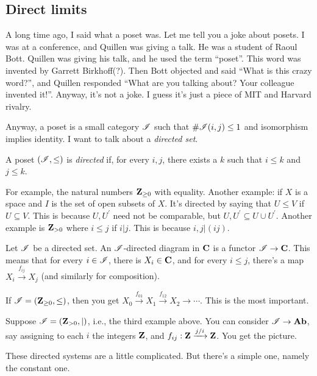 \subsection{Direct limits}
A long time ago, I said what a poset was. Let me tell you a joke about posets. I was at a conference, and Quillen was giving a talk. He was a student of Raoul Bott. Quillen was giving his talk, and he used the term ``poset''. This word was invented by Garrett Birkhoff(?). Then Bott objected and said ``What is this crazy word?'', and Quillen responded ``What are you talking about? Your colleague invented it!''. Anyway, it's not a joke. I guess it's just a piece of MIT and Harvard rivalry.

Anyway, a poset is a small category $\mathscr I$ such that $\#\mathscr I(i,j)\leq 1$ and isomorphism implies identity. I want to talk about a \emph{directed set}.
\begin{definition}
A poset $(\mathscr I,\leq)$ is \emph{directed} if, for every $i,j$, there exists a $k$ such that $i\leq k$ and $j\leq k$.
\end{definition}
\begin{example}
For example, the natural numbers $\mathbf Z_{\geq 0}$ with equality. Another example: if $X$ is a space and $I$ is the set of open subsets of $X$. It's directed by saying that $U\leq V$ if $U\subseteq V$. This is because $U,U^\prime$ need not be comparable, but $U,U^\prime\subseteq U\cup U^\prime$. Another example is $\mathbf Z_{>0}$ where $i\leq j$ if $i|j$. This is because $i,j|(ij)$.
\end{example}
\begin{definition}
Let $\mathscr I$ be a directed set. An $\mathscr I$-directed diagram in $\mathbf C$ is a functor $\mathscr I\to\mathbf C$. This means that for every $i\in \mathscr I$, there is $X_i\in\mathbf C$, and for every $i\leq j$, there's a map $X_i\xrightarrow{f_{ij}} X_j$ (and similarly for composition).
\end{definition}
\begin{example}\label{linear}
If $\mathscr I=(\mathbf Z_{\geq 0},\leq)$, then you get $X_0\xrightarrow{f_{01}}X_1\xrightarrow{f_{12}}X_2\to\cdots$. This is the most important.
\end{example}
\begin{example}
Suppose $\mathscr I=(\mathbf Z_{>0},|)$, i.e., the third example above. You can consider $\mathscr I\to\mathbf{Ab}$, say assigning to each $i$ the integers $\mathbf Z$, and $f_{ij}:\mathbf Z\xrightarrow{j/i}\mathbf Z$. You get the picture.
\end{example}
These directed systems are a little complicated. But there's a simple one, namely the constant one. 
